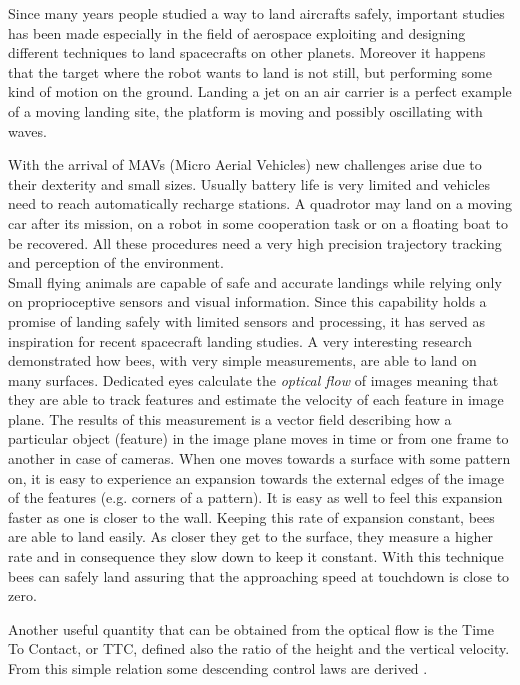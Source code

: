 Since many years people studied a way to land aircrafts safely, important studies has been made especially in the field of aerospace exploiting and designing different techniques to land spacecrafts on other planets. Moreover it happens that the target where the robot wants to land is not still, but performing some kind of motion on the ground. Landing a jet on an air carrier is a perfect example of a moving landing site, the platform is moving and possibly oscillating with waves.\par With the arrival of MAVs (Micro Aerial Vehicles) new challenges arise due to their dexterity and small sizes. Usually battery life is very limited and vehicles need to reach automatically recharge stations. A quadrotor may land on a moving car after its mission, on a robot in some cooperation task or on a floating boat to be recovered. All these procedures need a very high precision trajectory tracking and  perception of the environment.\\

\noindent
Small flying animals are capable of safe and accurate landings while relying only on proprioceptive sensors and visual information. Since this capability holds a promise of landing safely with limited sensors and processing, it has served as inspiration for recent spacecraft landing studies\cite{Izzo2012}. A very interesting research \cite{Baird2013} demonstrated how bees, with very simple measurements, are able to land on many surfaces. Dedicated eyes calculate the \textit{optical flow} of images meaning that they are able to track features and estimate the velocity of each feature in image plane. The results of this measurement is a vector field describing how a particular object (feature) in the image plane moves in time or from one frame to another in case of cameras. When one moves towards a surface with some pattern on, it is easy to experience an expansion towards the external edges of the image of the features (e.g. corners of a pattern). It is easy as well to feel this expansion faster as one is closer to the wall. Keeping this rate of expansion constant, bees are able to land easily. As closer they get to the surface, they measure a higher rate and in consequence they slow down to keep it constant. With this technique bees can safely land assuring that the approaching speed at touchdown is close to zero. \par
Another useful quantity that can be obtained from the optical flow is the Time To Contact, or TTC, defined also the ratio of the height and the vertical velocity. From this simple relation some descending control laws are derived \cite{Croon2015}. \\

